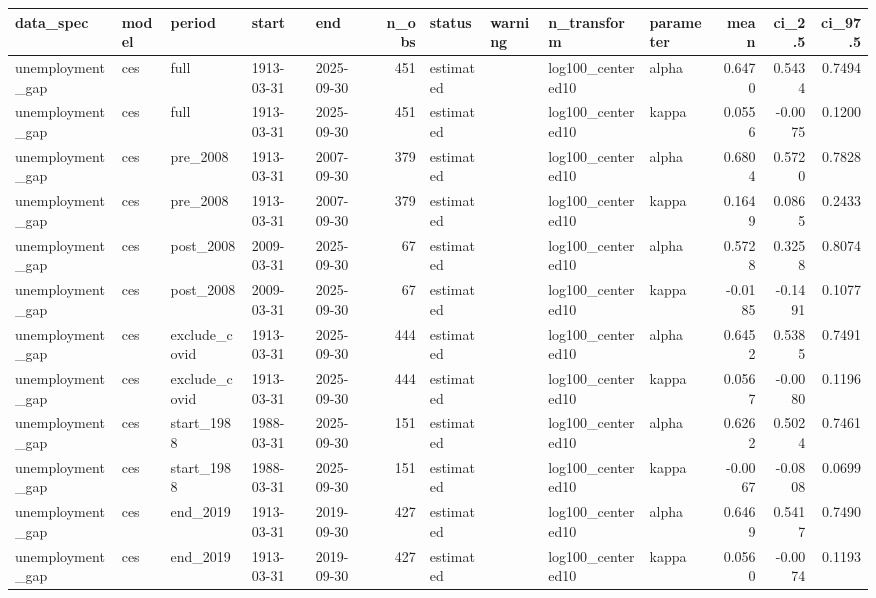 \begin{tabular}{lllllrllllrrr}
\toprule
data\_spec & model & period & start & end & n\_obs & status & warning & n\_transform & parameter & mean & ci\_2.5 & ci\_97.5 \\
\midrule
unemployment\_gap & ces & full & 1913-03-31 & 2025-09-30 & 451 & estimated &  & log100\_centered10 & alpha & 0.6470 & 0.5434 & 0.7494 \\
unemployment\_gap & ces & full & 1913-03-31 & 2025-09-30 & 451 & estimated &  & log100\_centered10 & kappa & 0.0556 & -0.0075 & 0.1200 \\
unemployment\_gap & ces & pre\_2008 & 1913-03-31 & 2007-09-30 & 379 & estimated &  & log100\_centered10 & alpha & 0.6804 & 0.5720 & 0.7828 \\
unemployment\_gap & ces & pre\_2008 & 1913-03-31 & 2007-09-30 & 379 & estimated &  & log100\_centered10 & kappa & 0.1649 & 0.0865 & 0.2433 \\
unemployment\_gap & ces & post\_2008 & 2009-03-31 & 2025-09-30 & 67 & estimated &  & log100\_centered10 & alpha & 0.5728 & 0.3258 & 0.8074 \\
unemployment\_gap & ces & post\_2008 & 2009-03-31 & 2025-09-30 & 67 & estimated &  & log100\_centered10 & kappa & -0.0185 & -0.1491 & 0.1077 \\
unemployment\_gap & ces & exclude\_covid & 1913-03-31 & 2025-09-30 & 444 & estimated &  & log100\_centered10 & alpha & 0.6452 & 0.5385 & 0.7491 \\
unemployment\_gap & ces & exclude\_covid & 1913-03-31 & 2025-09-30 & 444 & estimated &  & log100\_centered10 & kappa & 0.0567 & -0.0080 & 0.1196 \\
unemployment\_gap & ces & start\_1988 & 1988-03-31 & 2025-09-30 & 151 & estimated &  & log100\_centered10 & alpha & 0.6262 & 0.5024 & 0.7461 \\
unemployment\_gap & ces & start\_1988 & 1988-03-31 & 2025-09-30 & 151 & estimated &  & log100\_centered10 & kappa & -0.0067 & -0.0808 & 0.0699 \\
unemployment\_gap & ces & end\_2019 & 1913-03-31 & 2019-09-30 & 427 & estimated &  & log100\_centered10 & alpha & 0.6469 & 0.5417 & 0.7490 \\
unemployment\_gap & ces & end\_2019 & 1913-03-31 & 2019-09-30 & 427 & estimated &  & log100\_centered10 & kappa & 0.0560 & -0.0074 & 0.1193 \\
\bottomrule
\end{tabular}
